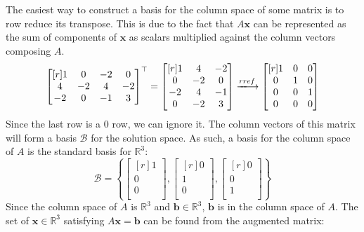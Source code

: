 \documentclass{article}
\theoremstyle{definition}
\newenvironment{solution}[1][]{\begin{replacementsoln}}{\end{replacementsoln}}
\begin{document}
\begin{solution}
The easiest way to construct a basis for the column space of some matrix is to row reduce its transpose. This is due to the fact that \(A \mathbf{x}\) can be represented as the sum of components of \(\mathbf{x}\) as scalars multiplied against the column vectors composing \(A\).
\[
  \begin{bmatrix}[r]
    1&0&-2&0\\
    4&-2&4&-2\\
    -2&0&-1&3\\
    \end{bmatrix}^{\top}= \begin{bmatrix}[r]
      1 & 4 &-2   \\
       0&-2  &0   \\
       -2&  4&-1   \\
       0&  -2&3   \\
    \end{bmatrix}\xlongrightarrow{rref} \begin{bmatrix}[r]
      1 &0  &0   \\
       0&1  &0   \\
       0&0  &1   \\
       0&0  &0   \\
    \end{bmatrix}
\]
Since the last row is a \(0\) row, we can ignore it. The column vectors of this matrix will form a basis \(\mathcal{B} \) for the solution space. As such, a basis for the column space of \(A\) is the standard basis for \(\mathbb{R}^3\):
\[
  \mathcal{B} = \left\{ \begin{bmatrix}[r]
     1 \\
     0 \\
     0 \\
  \end{bmatrix}, \begin{bmatrix}[r]
     0 \\
     1 \\
     0 \\
  \end{bmatrix}, \begin{bmatrix}[r]
     0 \\
     0 \\
     1 \\
  \end{bmatrix} \right\} 
\]
Since the column space of \(A\) is \(\mathbb{R}^3\) and \(\mathbf{b}\in\mathbb{R}^3\), \(\mathbf{b}\) is in the column space of \(A\). The set of \(\mathbf{x}\in\mathbb{R}^3\) satisfying \(A \mathbf{x}=\mathbf{b}\) can be found from the augmented matrix:

\end{solution}
\end{document}
